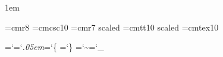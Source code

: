 

\let\amp=\&
\let\SS=\S
\let\PP=\P
\let\em=\it %

\newif\iftwoside\twosidefalse
\parskip 0pt %
\parindent 1em %

\font\eightrm=cmr8
\font\sc=cmcsc10
\let\mainfont=\tenrm
\font\titlefont=cmr7 scaled %
\font\ttitlefont=cmtt10 scaled %
\font\tentex=cmtex10 %
\let\idfont\it
\let\reservedfont\bf

\def\today{\ifcase\month\or
  January\or February\or March\or April\or May\or June\or
  July\or August\or September\or October\or November\or December\fi
  \space\number\day, \number\year}

\def\\#1{\leavevmode\hbox{\idfont#1\/\kern.05em}} %
\def\|#1{\leavevmode\hbox{$#1$}} %
\def\&#1{\leavevmode\hbox{\reservedfont#1\/}} %
\def\.#1{\leavevmode\hbox{\tentex %
  \let\\=\BS %
  \let\'=\RQ %
  \let\`=\LQ %
  \let\{=\LB %
  \let\}=\RB %
  \let\~=\TL %
  \let\ =\SP %
  \let\_=\UL %
  \let\&=\AM %
  #1}}
\def\#{\hbox{\tt\char`\#}} %
\def\${\hbox{\tt\char`\$}} %
\def\%{\hbox{\tt\char`\%}} %
\def\^{\ifmmode\mathchar"222 \else\char`^ \fi} %
\def\AT!{@} %
\def\@{@} %

\def\CD{\relax\ifmmode\let\DC\egroup\hbox\bgroup\else\let\DC\relax\fi}
\let\DC=\relax

\chardef\AM=`\& %
\chardef\BS=`\\ %
\chardef\LB=`\{ %
\def\LQ{{\tt\char'22}} %
\chardef\RB=`\} %
\def\RQ{{\tt\char'23}} %
\def\SP{{\tt\char`\ }} %
\chardef\TL=`\~ %
\chardef\UL=`\_ %

